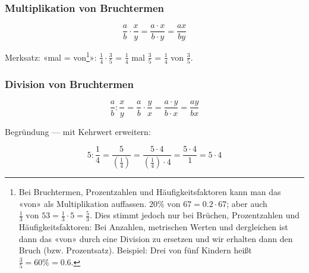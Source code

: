 
\subsubsection{Multiplikation von Bruchtermen}

\begin{gesetz}{}{}
$$\frac{a}{b}\cdot\frac{x}{y} = \frac{a\cdot x}{b\cdot y} = \frac{ax}{by}$$
\end{gesetz}

Merksatz:
«mal = von\footnote{Bei Bruchtermen, Prozentzahlen und Häufigkeitsfaktoren kann man das «von» als Multiplikation auffassen. $20\% \textrm{ von } 67 = 0.2 \cdot{} 67$; aber auch $\frac{1}{3} \textrm{ von } 53 = \frac{1}{3}\cdot{5}=\frac{5}{3}$. Dies stimmt jedoch nur bei Brüchen, Prozentzahlen und Häufigkeitsfaktoren: Bei Anzahlen, metrischen Werten und dergleichen ist dann das «von» durch eine Division zu ersetzen und wir erhalten dann den Bruch (bzw. Prozentsatz). Beispiel: Drei von fünf Kindern heißt $\frac{3}{5} = 60\% = 0.6$.}»:
$\frac{1}{4} \cdot \frac{3}{5}$ = $\frac{1}{4}$ mal $\frac{3}{5}$ = $\frac{1}{4}$ von $\frac{3}{5}$.

\subsubsection{Division von Bruchtermen}
\begin{gesetz}{}{}
$$\frac{a}{b} : \frac{x}{y}=\frac{a}{b}\cdot\frac{y}{x} = \frac{a\cdot y}{b\cdot x} = \frac{ay}{bx}$$
\end{gesetz}

Begründung — mit Kehrwert erweitern:

$$5 : \frac{1}{4} =
\frac{5}{\left(\frac{1}{4}\right)} =
\frac{5\cdot{}4}{\left(\frac{1}{4}\right)\cdot{}4} =
\frac{5\cdot{}4}{1} = 5 \cdot{} 4$$
\newpage



\newpage
